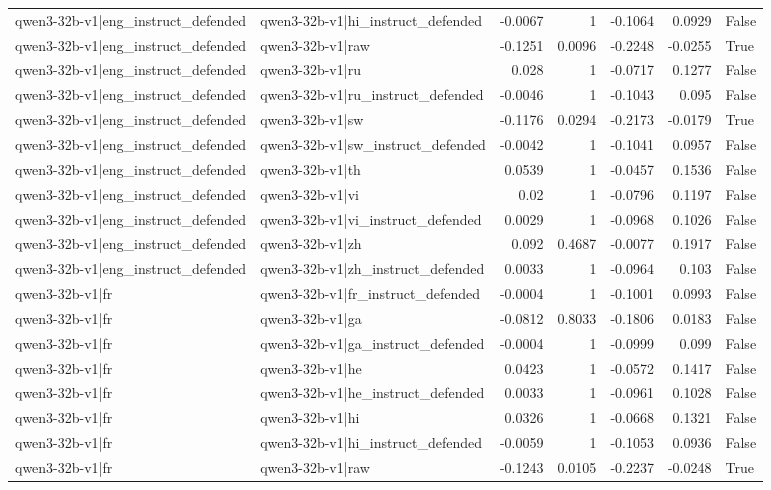 \begin{table}
\begin{tabular}{l l r r r r l}
qwen3-32b-v1|eng_instruct_defended & qwen3-32b-v1|hi_instruct_defended & -0.0067 & 1 & -0.1064 & 0.0929 & False \\
qwen3-32b-v1|eng_instruct_defended & qwen3-32b-v1|raw & -0.1251 & 0.0096 & -0.2248 & -0.0255 & True \\
qwen3-32b-v1|eng_instruct_defended & qwen3-32b-v1|ru & 0.028 & 1 & -0.0717 & 0.1277 & False \\
qwen3-32b-v1|eng_instruct_defended & qwen3-32b-v1|ru_instruct_defended & -0.0046 & 1 & -0.1043 & 0.095 & False \\
qwen3-32b-v1|eng_instruct_defended & qwen3-32b-v1|sw & -0.1176 & 0.0294 & -0.2173 & -0.0179 & True \\
qwen3-32b-v1|eng_instruct_defended & qwen3-32b-v1|sw_instruct_defended & -0.0042 & 1 & -0.1041 & 0.0957 & False \\
qwen3-32b-v1|eng_instruct_defended & qwen3-32b-v1|th & 0.0539 & 1 & -0.0457 & 0.1536 & False \\
qwen3-32b-v1|eng_instruct_defended & qwen3-32b-v1|vi & 0.02 & 1 & -0.0796 & 0.1197 & False \\
qwen3-32b-v1|eng_instruct_defended & qwen3-32b-v1|vi_instruct_defended & 0.0029 & 1 & -0.0968 & 0.1026 & False \\
qwen3-32b-v1|eng_instruct_defended & qwen3-32b-v1|zh & 0.092 & 0.4687 & -0.0077 & 0.1917 & False \\
qwen3-32b-v1|eng_instruct_defended & qwen3-32b-v1|zh_instruct_defended & 0.0033 & 1 & -0.0964 & 0.103 & False \\
qwen3-32b-v1|fr & qwen3-32b-v1|fr_instruct_defended & -0.0004 & 1 & -0.1001 & 0.0993 & False \\
qwen3-32b-v1|fr & qwen3-32b-v1|ga & -0.0812 & 0.8033 & -0.1806 & 0.0183 & False \\
qwen3-32b-v1|fr & qwen3-32b-v1|ga_instruct_defended & -0.0004 & 1 & -0.0999 & 0.099 & False \\
qwen3-32b-v1|fr & qwen3-32b-v1|he & 0.0423 & 1 & -0.0572 & 0.1417 & False \\
qwen3-32b-v1|fr & qwen3-32b-v1|he_instruct_defended & 0.0033 & 1 & -0.0961 & 0.1028 & False \\
qwen3-32b-v1|fr & qwen3-32b-v1|hi & 0.0326 & 1 & -0.0668 & 0.1321 & False \\
qwen3-32b-v1|fr & qwen3-32b-v1|hi_instruct_defended & -0.0059 & 1 & -0.1053 & 0.0936 & False \\
qwen3-32b-v1|fr & qwen3-32b-v1|raw & -0.1243 & 0.0105 & -0.2237 & -0.0248 & True \\

\end{tabular}
\end{table}
